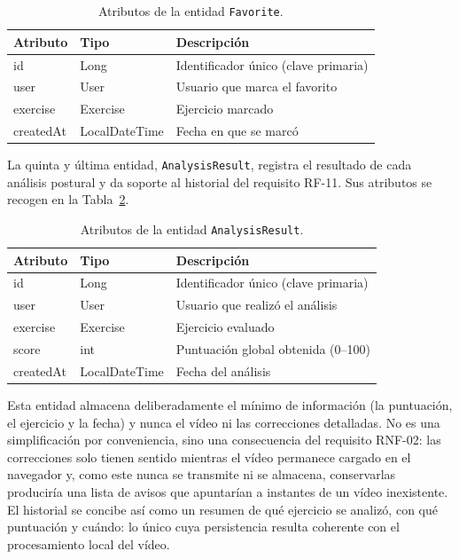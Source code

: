 \documentclass[12pt,a4paper,twoside,openright]{book}
\begin{document}
    \begin{table}[htbp]
        \centering
        \begin{tabular}{lll}
            \toprule
            \textbf{Atributo} & \textbf{Tipo} & \textbf{Descripción} \\
            \midrule
            id        & Long          & Identificador único (clave primaria) \\
            user      & User          & Usuario que marca el favorito \\
            exercise  & Exercise      & Ejercicio marcado \\
            createdAt & LocalDateTime & Fecha en que se marcó \\
            \bottomrule
        \end{tabular}
        \caption{Atributos de la entidad \texttt{Favorite}.}
        \label{tab:entidad-favorite}
    \end{table}

    La quinta y última entidad, \texttt{AnalysisResult}, registra el resultado de
    cada análisis postural y da soporte al historial del requisito RF-11. Sus
    atributos se recogen en la Tabla~\ref{tab:entidad-analysis}.

    \begin{table}[htbp]
        \centering
        \begin{tabular}{lll}
            \toprule
            \textbf{Atributo} & \textbf{Tipo} & \textbf{Descripción} \\
            \midrule
            id        & Long          & Identificador único (clave primaria) \\
            user      & User          & Usuario que realizó el análisis \\
            exercise  & Exercise      & Ejercicio evaluado \\
            score     & int           & Puntuación global obtenida (0--100) \\
            createdAt & LocalDateTime & Fecha del análisis \\
            \bottomrule
        \end{tabular}
        \caption{Atributos de la entidad \texttt{AnalysisResult}.}
        \label{tab:entidad-analysis}
    \end{table}

    Esta entidad almacena deliberadamente el mínimo de información (la puntuación,
    el ejercicio y la fecha) y nunca el vídeo ni las correcciones
    detalladas. No es una simplificación por conveniencia, sino una consecuencia
    del requisito RNF-02: las correcciones solo tienen sentido mientras el vídeo
    permanece cargado en el navegador y, como este nunca se transmite ni se
    almacena, conservarlas produciría una lista de avisos que apuntarían a
    instantes de un vídeo inexistente. El historial se concibe así como
    un resumen de qué ejercicio se analizó, con qué puntuación y cuándo:
    lo único cuya persistencia resulta coherente con el procesamiento local del vídeo.
\end{document}
